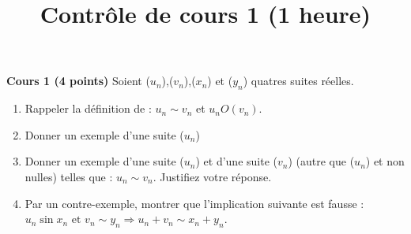 \documentclass{article}
\author{}
\date{}
\title{Contrôle de cours 1 (1 heure)}
\begin{document}
\maketitle
\textbf{Cours 1 (4 points)}\newline
Soient ($u_{n}$),($v_{n}$),($x_{n}$) et ($y_{n}$) quatres suites réelles.
\begin{enumerate}
    \item Rappeler la définition de : $u_{n}\sim v_{n}$ et $u_{n}O(v_{n})$.
    \item Donner un exemple d'une suite ($u_{n}$)
    \item Donner un exemple d'une suite ($u_{n}$) et d'une suite ($v_{n}$) (autre que ($u_{n}$) et non nulles) telles que : $u_{n}\sim v_{n}$. Justifiez votre réponse.
    \item Par un contre-exemple, montrer que l'implication suivante est fausse : $u_{n}\sin x_{n} \text{ et } v_{n}\sim y_{n} \Longrightarrow u_{n}+v_{n}\sim x_{n}+y_{n}$.

\end{enumerate}
\end{document}
